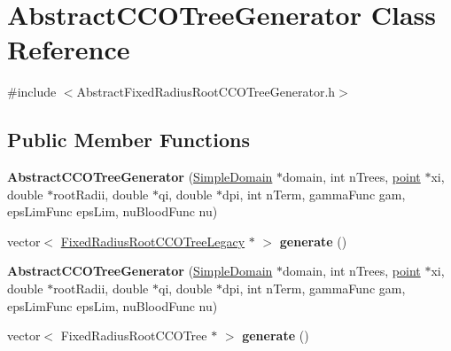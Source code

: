 \hypertarget{class_abstract_c_c_o_tree_generator}{}\section{Abstract\+C\+C\+O\+Tree\+Generator Class Reference}
\label{class_abstract_c_c_o_tree_generator}


{\ttfamily \#include $<$Abstract\+Fixed\+Radius\+Root\+C\+C\+O\+Tree\+Generator.\+h$>$}

\subsection*{Public Member Functions}
\begin{DoxyCompactItemize}
\item 
\mbox{\label{class_abstract_c_c_o_tree_generator_a05e22c19531a6e6b385b93a5285e5ac4}} 
{\bfseries Abstract\+C\+C\+O\+Tree\+Generator} (\hyperlink{class_simple_domain}{Simple\+Domain} $\ast$domain, int n\+Trees, \hyperlink{structpoint}{point} $\ast$xi, double $\ast$root\+Radii, double $\ast$qi, double $\ast$dpi, int n\+Term, gamma\+Func gam, eps\+Lim\+Func eps\+Lim, nu\+Blood\+Func nu)
\item 
\mbox{\label{class_abstract_c_c_o_tree_generator_a1429db3e7545f4004bdd04388bec9dbe}} 
vector$<$ \hyperlink{class_fixed_radius_root_c_c_o_tree_legacy}{Fixed\+Radius\+Root\+C\+C\+O\+Tree\+Legacy} $\ast$ $>$ {\bfseries generate} ()
\item 
\mbox{\label{class_abstract_c_c_o_tree_generator_a05e22c19531a6e6b385b93a5285e5ac4}} 
{\bfseries Abstract\+C\+C\+O\+Tree\+Generator} (\hyperlink{class_simple_domain}{Simple\+Domain} $\ast$domain, int n\+Trees, \hyperlink{structpoint}{point} $\ast$xi, double $\ast$root\+Radii, double $\ast$qi, double $\ast$dpi, int n\+Term, gamma\+Func gam, eps\+Lim\+Func eps\+Lim, nu\+Blood\+Func nu)
\item 
\mbox{\label{class_abstract_c_c_o_tree_generator_a23aec3b49cc8c1f19d7bb8af99ea8ece}} 
vector$<$ Fixed\+Radius\+Root\+C\+C\+O\+Tree $\ast$ $>$ {\bfseries generate} ()
\end{DoxyCompactItemize}

